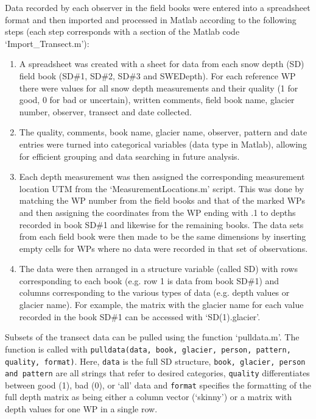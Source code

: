 \documentclass{sfuthesis}
\begin{document}
\begin{appendices}
Data recorded by each observer in the field books were entered into a spreadsheet format and then imported and processed in Matlab according to the following steps (each step corresponds with a section of the Matlab code `Import\_Transect.m'):
\begin{enumerate}
	\item A spreadsheet was created with a sheet for data from each snow depth (SD) field book (SD\#1, SD\#2, SD\#3 and SWEDepth). For each reference WP there were values for all snow depth measurements and their quality (1 for good, 0 for bad or uncertain), written comments, field book name, glacier number, observer, transect and date collected.  
	\item The quality, comments, book name, glacier name, observer, pattern and date entries were turned into categorical variables (data type in Matlab), allowing for efficient grouping and data searching in future analysis.
	\item Each depth measurement was then assigned the corresponding measurement location UTM from the `MeasurementLocations.m' script. This was done by matching the WP number from the field books and that of the marked WPs and then assigning the coordinates from the WP ending with .1 to depths recorded in book SD\#1 and likewise for the remaining books. The data sets from each field book were then made to be the same dimensions by inserting empty cells for WPs where no data were recorded in that set of observations. 
	\item The data were then arranged in a structure variable (called SD) with rows corresponding to each book (e.g. row 1 is data from book SD\#1) and columns corresponding to the various types of data (e.g. depth values or glacier name). For example, the matrix with the glacier name for each value recorded in the book SD\#1 can be accessed with `SD(1).glacier'.
\end{enumerate}

Subsets of the transect data can be pulled using the function `pulldata.m'. The function is called with \texttt{pulldata(data, book, glacier, person, pattern, quality, format)}. Here, \texttt{data} is the full SD structure, \texttt{book, glacier, person and pattern} are all strings that refer to desired categories, \texttt{quality} differentiates between good (1), bad (0), or `all' data and \texttt{format} specifies the formatting of the full depth matrix as being either a column vector (`skinny') or a matrix with depth values for one WP in a single row. 


\end{appendices}
\end{document}
